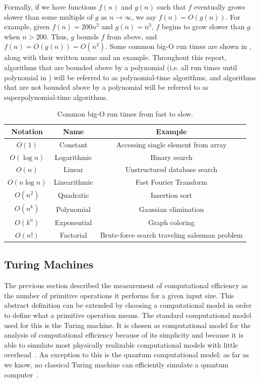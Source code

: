 Formally, if we have functions $f(n)$ and $g(n)$ such that $f$ eventually grows slower than some multiple of $g$ as $n \to \infty$, we say $f(n) = O(g(n))$.
For example, given $f(n) = 200n^2$ and $g(n) = n^3$, $f$ begins to grow slower than $g$ when $n > 200$.
Thus, $g$ bounds $f$ from above, and $f(n) = O(g(n)) = O(n^3)$.
Some common big-O run times are shown in , along with their written name and an example.
Throughout this report, algorithms that are bounded above by a polynomial (i.e. all run times until polynomial in ) will be referred to as polynomial-time algorithms, and algorithms that are not bounded above by a polynomial will be referred to as superpolynomial-time algorithms.

\begin{table}[ht]
    \centering
    {\renewcommand{\arraystretch}{1.1}
    \begin{tabular}{ c|c|c }
        Notation & Name & Example \\
        \hline
        $O(1)$ & Constant & Accessing single element from array \\
        $O(\log n)$ & Logarithmic & Binary search \\
        $O(n)$ & Linear & Unstructured database search \\
        $O(n \log n)$ & Linearithmic & Fast Fourier Transform \\
        $O(n^2)$ & Quadratic & Insertion sort \\
        $O(n^k)$ & Polynomial & Gaussian elimination \\
        $O(k^n)$ & Exponential & Graph coloring \\
        $O(n!)$ & Factorial & Brute-force search traveling salesman problem \\
    \end{tabular}
    }
    \caption{Common big-O run times from fast to slow.}
    \label{table:common-big-o}
\end{table}

\subsection{Turing Machines}
The previous section described the measurement of computational efficiency as the number of primitive operations it performs for a given input size.
This abstract definition can be extended by choosing a computational model in order to define what a primitive operation means.
The standard computational model used for this is the Turing machine.
It is chosen as computational model for the analysis of computational efficiency because of its simplicity and because it is able to simulate most physically realizable computational models with little overhead~\cite{arora2009computational}.
An exception to this is the quantum computational model: as far as we know, no classical Turing machine can efficiently simulate a quantum computer~\cite{deutsch1985quantum}.

